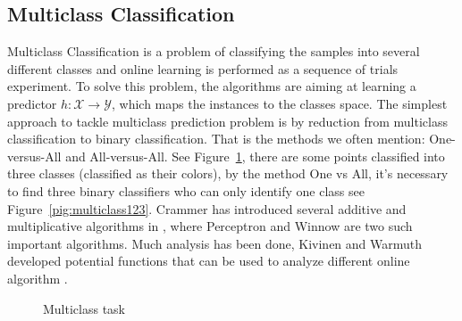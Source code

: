 \subsection{Multiclass Classification}
\label{subsec:multiclass}

Multiclass Classification is a problem of classifying the samples into several different classes and online learning is performed as a sequence of trials experiment. To solve this problem, the algorithms are aiming at learning a predictor $h: \mathscr{X} \rightarrow \mathscr{Y}$, which maps the instances to the classes space. The simplest approach to tackle multiclass prediction problem is by reduction from multiclass classification to binary classification. That is the methods we often mention: One-versus-All and All-versus-All. See Figure~\ref{pig:multiclass0}, there are some points classified into three classes (classified as their colors), by the method One vs All, it's necessary to find three binary classifiers who can only identify one class see Figure~\ref{pig:multiclass123}. Crammer has introduced several additive and multiplicative algorithms in \cite{crammer2003ultraconservative}, where Perceptron \cite{rosenblatt1958perceptron} and Winnow \cite{littlestone1988learning} are two such important algorithms. Much analysis has been done, Kivinen and Warmuth developed potential functions that can be used to analyze different online algorithm \cite{kivinen1995additive}. 

\begin{figure}[!h]
\vspace{.2in}
\caption{Multiclass task}
\label{pig:multiclass0}
\end{figure}

